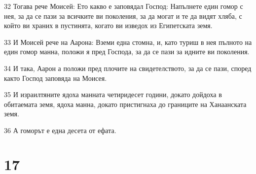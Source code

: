 \par 32 Тогава рече Моисей: Ето какво е заповядал Господ: Напълнете един гомор с нея, за да се пази за всичките ви поколения, за да могат и те да видят хляба, с който ви храних в пустинята, когато ви изведох из Египетската земя.
\par 33 И Моисей рече на Аарона: Вземи една стомна, и, като туриш в нея пълното на един гомор манна, положи я пред Господа, за да се пази за идните ви поколения.
\par 34 И така, Аарон а положи пред плочите на свидетелството, за да се пази, според както Господ заповяда на Моисея.
\par 35 И израилтяните ядоха манната четиридесет години, докато дойдоха в обитаемата земя, ядоха манна, докато пристигнаха до границите на Ханаанската земя.
\par 36 А гоморът е една десета от ефата.

\chapter{17}

